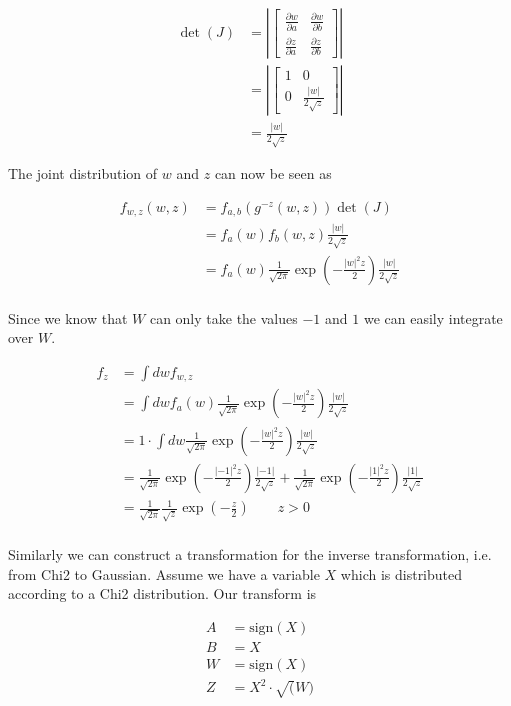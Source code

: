 \begin{align*}
	\det(J) &= \left|\begin{bmatrix}
		\frac{\partial w}{\partial a} & \frac{\partial w}{\partial b} \\
		\frac{\partial z}{\partial a} & \frac{\partial z}{\partial b}
	\end{bmatrix}\right| \\
	&= \left|\begin{bmatrix}
	1 & 0 \\
	0 & \frac{|w|}{2\sqrt{z}}
	\end{bmatrix}\right| \\
	&= \frac{|w|}{2\sqrt{z}}
\end{align*}

The joint distribution of $w$ and $z$ can now be seen as 

\begin{align*}
		f_{w,z}(w,z) &= f_{a,b}(g^{-z}(w,z)) \det(J) \\
		&= f_a(w) f_b(w,z) \frac{|w|}{2\sqrt{z}} \\
		&= f_a(w) \frac{1}{\sqrt{2\pi}} \exp\left(-\frac{|w|^2 z}{2}\right) \frac{|w|}{2\sqrt{z}} \\
\end{align*}

Since we know that $W$ can only take the values $-1$ and $1$ we can easily integrate over $W$. 

\begin{align*}
	f_{z} &= \int dw f_{w,z} \\
	&= \int dw f_a(w) \frac{1}{\sqrt{2\pi}} \exp\left(-\frac{|w|^2 z}{2}\right) \frac{|w|}{2\sqrt{z}} \\
	&= 1 \cdot  \int dw \frac{1}{\sqrt{2\pi}} \exp\left(-\frac{|w|^2 z}{2}\right) \frac{|w|}{2\sqrt{z}} \\
	&= \frac{1}{\sqrt{2\pi}} \exp\left(-\frac{|-1|^2 z}{2}\right) \frac{|-1|}{2\sqrt{z}}  + \frac{1}{\sqrt{2\pi}} \exp\left(-\frac{|1|^2 z}{2}\right) \frac{|1|}{2\sqrt{z}} \\
	&= \frac{1}{\sqrt{2\pi}} \frac{1}{\sqrt{z}} \exp\left(-\frac{z}{2}\right) \qquad z > 0\\
\end{align*}

Similarly we can construct a transformation for the inverse transformation, i.e. from Chi2 to Gaussian. Assume we have a variable $X$ which is distributed according to a Chi2 distribution. Our transform is

\begin{align*}
	A &= \text{sign}(X) \\
	B &= X \\
	W &= \text{sign}(X) \\
	Z &= X^2 \cdot \sqrt(W)
\end{align*}

